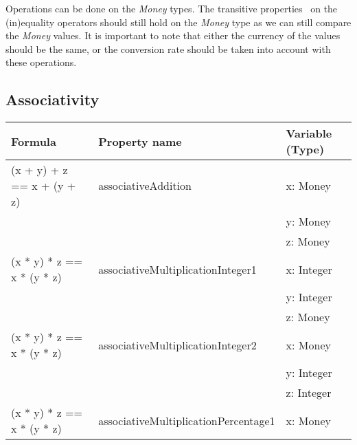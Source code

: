 \FloatBarrier
Operations can be done on the \textit{Money} types. The transitive properties~\cite{raftery2011perspective} on the (in)equality operators should still hold on the \textit{Money} type as we can still compare the \textit{Money} values. It is important to note that either the currency of the values should be the same, or the conversion rate should be taken into account with these operations.

\subsection*{Associativity}
\label{ssct:4_associativity}
\FloatBarrier
\begin{table}[!ht]
\centering
\begin{tabular}{lll}
\hline
                        \textbf{Formula}           & \textbf{Property name}               & \textbf{Variable (Type)} \\ \hline
\rowcolor[HTML]{EFEFEF} (x + y) + z == x + (y + z) & associativeAddition                  & x: Money                 \\
\rowcolor[HTML]{EFEFEF}                            &                                      & y: Money                 \\
\rowcolor[HTML]{EFEFEF}                            &                                      & z: Money                 \\
                        (x * y) * z == x * (y * z) & associativeMultiplicationInteger1    & x: Integer               \\
                                                   &                                      & y: Integer               \\
                                                   &                                      & z: Money                 \\
\rowcolor[HTML]{EFEFEF} (x * y) * z == x * (y * z) & associativeMultiplicationInteger2    & x: Money                 \\
\rowcolor[HTML]{EFEFEF}                            &                                      & y: Integer               \\
\rowcolor[HTML]{EFEFEF}                            &                                      & z: Integer               \\
                        (x * y) * z == x * (y * z) & associativeMultiplicationPercentage1 & x: Money                 \\

\end{tabular}
\end{table}
